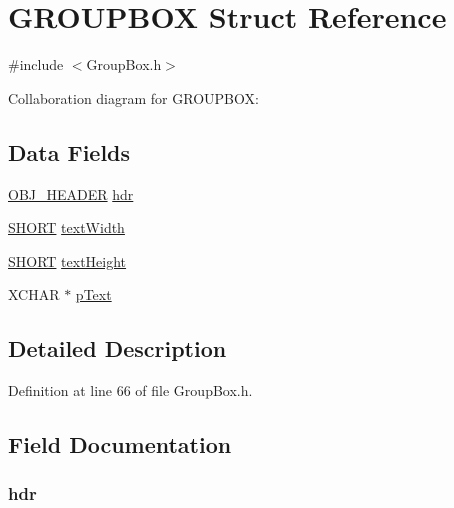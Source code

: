 \hypertarget{struct_g_r_o_u_p_b_o_x}{}\section{G\+R\+O\+U\+P\+B\+O\+X Struct Reference}
\label{struct_g_r_o_u_p_b_o_x}


{\ttfamily \#include $<$Group\+Box.\+h$>$}



Collaboration diagram for G\+R\+O\+U\+P\+B\+O\+X\+:
\subsection*{Data Fields}
\begin{DoxyCompactItemize}
\item 
\hyperlink{struct_o_b_j___h_e_a_d_e_r}{O\+B\+J\+\_\+\+H\+E\+A\+D\+E\+R} \hyperlink{struct_g_r_o_u_p_b_o_x_abeffaf353197a8a64fba6707b68ce0be}{hdr}
\item 
\hyperlink{_generic_type_defs_8h_ae9bb25d3afecf3bfab0fbe3c22c2050f}{S\+H\+O\+R\+T} \hyperlink{struct_g_r_o_u_p_b_o_x_a9fbde8f74d930599fd9206a263e46cd6}{text\+Width}
\item 
\hyperlink{_generic_type_defs_8h_ae9bb25d3afecf3bfab0fbe3c22c2050f}{S\+H\+O\+R\+T} \hyperlink{struct_g_r_o_u_p_b_o_x_a40fa9c35391b0005032180b85e7afd34}{text\+Height}
\item 
X\+C\+H\+A\+R $\ast$ \hyperlink{struct_g_r_o_u_p_b_o_x_a934b5563cdaf14803728ff3a7b7e8c7f}{p\+Text}
\end{DoxyCompactItemize}


\subsection{Detailed Description}


Definition at line 66 of file Group\+Box.\+h.



\subsection{Field Documentation}
\hypertarget{struct_g_r_o_u_p_b_o_x_abeffaf353197a8a64fba6707b68ce0be}{}
\subsubsection[{hdr}]{ hdr}\label{struct_g_r_o_u_p_b_o_x_abeffaf353197a8a64fba6707b68ce0be}



